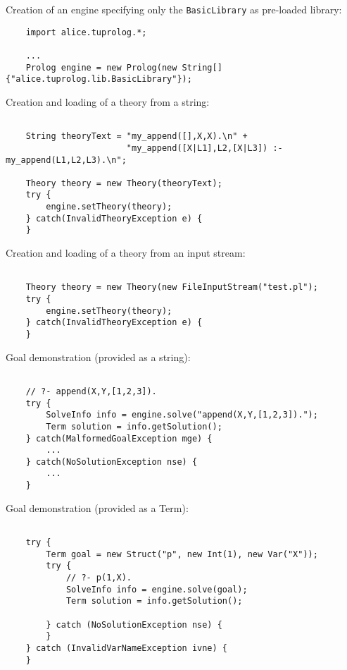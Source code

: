 \noindent Creation of an engine specifying only the
\texttt{BasicLibrary} as pre-loaded library:

{\tt\scriptsize{
\begin{verbatim}
    import alice.tuprolog.*;

    ...
    Prolog engine = new Prolog(new String[]{"alice.tuprolog.lib.BasicLibrary"});
\end{verbatim} }}

\noindent Creation and loading of a theory from a string:

{\tt\scriptsize{\begin{verbatim}

    String theoryText = "my_append([],X,X).\n" +
                        "my_append([X|L1],L2,[X|L3]) :- my_append(L1,L2,L3).\n";

    Theory theory = new Theory(theoryText);
    try {
        engine.setTheory(theory);
    } catch(InvalidTheoryException e) {
    }
\end{verbatim} }}

\noindent Creation and loading of a theory from an input stream:

{\tt\scriptsize{\begin{verbatim}

    Theory theory = new Theory(new FileInputStream("test.pl");
    try {
        engine.setTheory(theory);
    } catch(InvalidTheoryException e) {
    }
\end{verbatim} }}

\noindent Goal demonstration (provided as a string):

{\tt\scriptsize{\begin{verbatim}

    // ?- append(X,Y,[1,2,3]).
    try {
        SolveInfo info = engine.solve("append(X,Y,[1,2,3]).");
        Term solution = info.getSolution();
    } catch(MalformedGoalException mge) {
        ...
    } catch(NoSolutionException nse) {
        ...
    }
\end{verbatim} }}

\noindent Goal demonstration (provided as a Term):

{\tt\scriptsize{\begin{verbatim}

    try {
        Term goal = new Struct("p", new Int(1), new Var("X"));
        try {
            // ?- p(1,X).
            SolveInfo info = engine.solve(goal);
            Term solution = info.getSolution();

        } catch (NoSolutionException nse) {
        }
    } catch (InvalidVarNameException ivne) {
    }
\end{verbatim} }}

